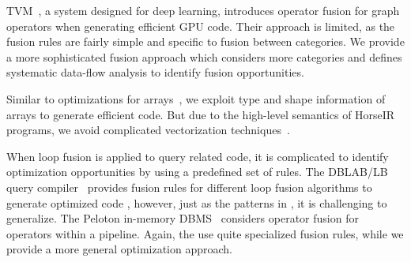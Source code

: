 TVM~\cite{Chen18:TVM}, a system designed for deep learning, introduces
operator fusion for graph operators when generating efficient GPU code.
Their approach is limited, as the fusion rules are fairly simple and
specific to fusion between categories.  We provide a more sophisticated
fusion approach which considers more categories and defines systematic
data-flow analysis to identify fusion opportunities.

Similar to optimizations for arrays~\cite{KumarH14,FoleyH16matjuice},
we exploit type and shape information of arrays to generate efficient code.
But due to the high-level semantics of HorseIR programs, we avoid
complicated vectorization techniques~\cite{menon1999case,ChenKLH16}.

When loop fusion is applied to query related code, it is complicated to
identify optimization opportunities by using a predefined set of rules.
The DBLAB/LB query compiler~\cite{ShaikhhaKPBD016} 
provides fusion rules for different loop fusion algorithms to generate optimized code
\cite{Shaikhha2018:LoopFusion}, however, just as the patterns in \OldPaper, it is
challenging to generalize. %
The Peloton in-memory DBMS~\cite{Menon2017:Peloton} considers operator
fusion for operators within a pipeline. Again, the use quite specialized fusion
rules, while we provide a more general optimization approach. 



